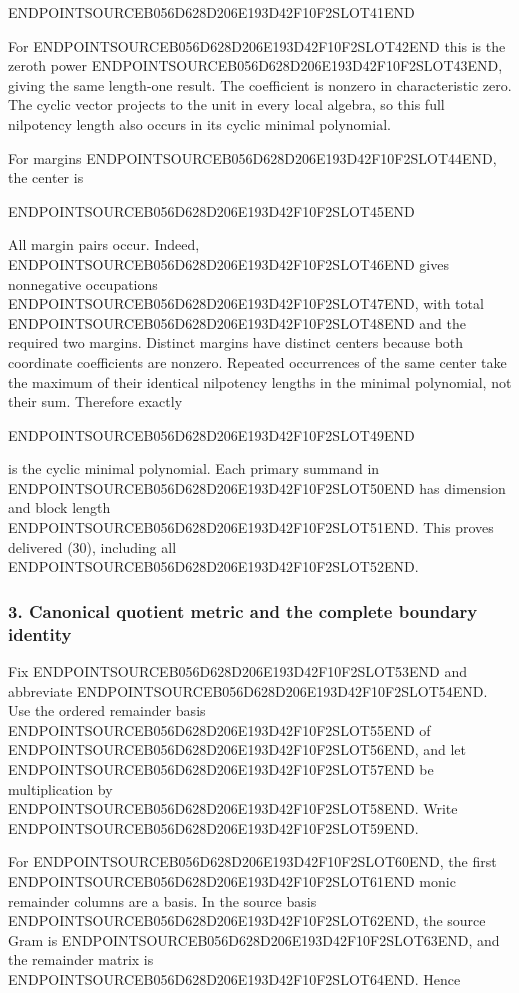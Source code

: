 ENDPOINTSOURCEB056D628D206E193D42F10F2SLOT41END

For ENDPOINTSOURCEB056D628D206E193D42F10F2SLOT42END this is the zeroth power ENDPOINTSOURCEB056D628D206E193D42F10F2SLOT43END, giving the same length-one result. The coefficient is nonzero in characteristic zero. The cyclic vector projects to the unit in every local algebra, so this full nilpotency length also occurs in its cyclic minimal polynomial.

For margins ENDPOINTSOURCEB056D628D206E193D42F10F2SLOT44END, the center is

ENDPOINTSOURCEB056D628D206E193D42F10F2SLOT45END

All margin pairs occur. Indeed, ENDPOINTSOURCEB056D628D206E193D42F10F2SLOT46END gives nonnegative occupations ENDPOINTSOURCEB056D628D206E193D42F10F2SLOT47END, with total ENDPOINTSOURCEB056D628D206E193D42F10F2SLOT48END and the required two margins. Distinct margins have distinct centers because both coordinate coefficients are nonzero. Repeated occurrences of the same center take the maximum of their identical nilpotency lengths in the minimal polynomial, not their sum. Therefore exactly

ENDPOINTSOURCEB056D628D206E193D42F10F2SLOT49END

is the cyclic minimal polynomial. Each primary summand in ENDPOINTSOURCEB056D628D206E193D42F10F2SLOT50END has dimension and block length ENDPOINTSOURCEB056D628D206E193D42F10F2SLOT51END. This proves delivered (30), including all ENDPOINTSOURCEB056D628D206E193D42F10F2SLOT52END.

\subsubsection{3. Canonical quotient metric and the complete boundary identity}\label{endpoint-gamma_review--canonical-quotient-metric-and-the-complete-boundary-identity}

Fix ENDPOINTSOURCEB056D628D206E193D42F10F2SLOT53END and abbreviate ENDPOINTSOURCEB056D628D206E193D42F10F2SLOT54END. Use the ordered remainder basis ENDPOINTSOURCEB056D628D206E193D42F10F2SLOT55END of ENDPOINTSOURCEB056D628D206E193D42F10F2SLOT56END, and let ENDPOINTSOURCEB056D628D206E193D42F10F2SLOT57END be multiplication by ENDPOINTSOURCEB056D628D206E193D42F10F2SLOT58END. Write ENDPOINTSOURCEB056D628D206E193D42F10F2SLOT59END.

For ENDPOINTSOURCEB056D628D206E193D42F10F2SLOT60END, the first ENDPOINTSOURCEB056D628D206E193D42F10F2SLOT61END monic remainder columns are a basis. In the source basis ENDPOINTSOURCEB056D628D206E193D42F10F2SLOT62END, the source Gram is ENDPOINTSOURCEB056D628D206E193D42F10F2SLOT63END, and the remainder matrix is ENDPOINTSOURCEB056D628D206E193D42F10F2SLOT64END. Hence

